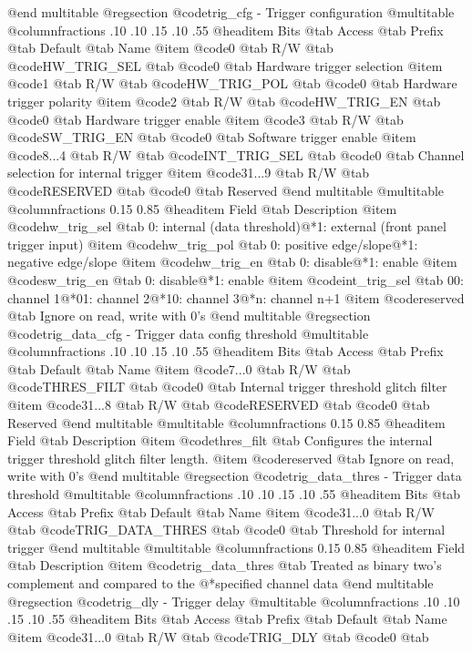 @end multitable
@regsection @code{trig_cfg} - Trigger configuration
@multitable @columnfractions .10 .10 .15 .10 .55
@headitem Bits @tab Access @tab Prefix @tab Default @tab Name
@item @code{0}
@tab R/W @tab
@code{HW_TRIG_SEL}
@tab @code{0} @tab 
Hardware trigger selection
@item @code{1}
@tab R/W @tab
@code{HW_TRIG_POL}
@tab @code{0} @tab 
Hardware trigger polarity
@item @code{2}
@tab R/W @tab
@code{HW_TRIG_EN}
@tab @code{0} @tab 
Hardware trigger enable
@item @code{3}
@tab R/W @tab
@code{SW_TRIG_EN}
@tab @code{0} @tab 
Software trigger enable
@item @code{8...4}
@tab R/W @tab
@code{INT_TRIG_SEL}
@tab @code{0} @tab 
Channel selection for internal trigger
@item @code{31...9}
@tab R/W @tab
@code{RESERVED}
@tab @code{0} @tab 
Reserved
@end multitable
@multitable @columnfractions 0.15 0.85
@headitem Field @tab Description
@item @code{hw_trig_sel} @tab 0: internal (data threshold)@*1: external (front panel trigger input)
@item @code{hw_trig_pol} @tab 0: positive edge/slope@*1: negative edge/slope
@item @code{hw_trig_en} @tab 0: disable@*1: enable
@item @code{sw_trig_en} @tab 0: disable@*1: enable
@item @code{int_trig_sel} @tab 00: channel 1@*01: channel 2@*10: channel 3@*n: channel n+1
@item @code{reserved} @tab Ignore on read, write with 0's
@end multitable
@regsection @code{trig_data_cfg} - Trigger data config threshold
@multitable @columnfractions .10 .10 .15 .10 .55
@headitem Bits @tab Access @tab Prefix @tab Default @tab Name
@item @code{7...0}
@tab R/W @tab
@code{THRES_FILT}
@tab @code{0} @tab 
Internal trigger threshold glitch filter
@item @code{31...8}
@tab R/W @tab
@code{RESERVED}
@tab @code{0} @tab 
Reserved
@end multitable
@multitable @columnfractions 0.15 0.85
@headitem Field @tab Description
@item @code{thres_filt} @tab Configures the internal trigger threshold glitch filter length.
@item @code{reserved} @tab Ignore on read, write with 0's
@end multitable
@regsection @code{trig_data_thres} - Trigger data threshold
@multitable @columnfractions .10 .10 .15 .10 .55
@headitem Bits @tab Access @tab Prefix @tab Default @tab Name
@item @code{31...0}
@tab R/W @tab
@code{TRIG_DATA_THRES}
@tab @code{0} @tab 
Threshold for internal trigger
@end multitable
@multitable @columnfractions 0.15 0.85
@headitem Field @tab Description
@item @code{trig_data_thres} @tab Treated as binary two's complement and compared to the @*specified channel data
@end multitable
@regsection @code{trig_dly} - Trigger delay
@multitable @columnfractions .10 .10 .15 .10 .55
@headitem Bits @tab Access @tab Prefix @tab Default @tab Name
@item @code{31...0}
@tab R/W @tab
@code{TRIG_DLY}
@tab @code{0} @tab 
